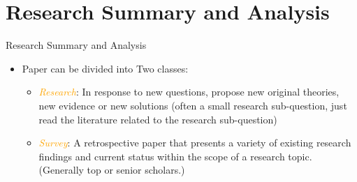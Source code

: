 \documentclass[
 size=14pt,
 paper=smartboard,  %
 mode=present, 		%
 display=slides, 	%
 style=tuliplab,  	%
 pauseslide,
 fleqn,leqno]{powerdot}{}
\begin{document}
\section{Research Summary and Analysis}

\begin{slide}[toc=,bm=]{Research Summary and Analysis}

\begin{itemize}
  \item Paper can be divided into Two classes:
  \begin{itemize}
    \item  \textcolor{orange}{\textit{Research}}: In response to new questions, propose new original theories, new evidence or new solutions (often a small research sub-question, just read the literature related to the research sub-question)
    \item  \textcolor{orange}{\textit{Survey}}: A retrospective paper that presents a variety of existing research findings and current status within the scope of a research topic. (Generally top or senior scholars.)
  \end{itemize}
\end{itemize}
\end{slide}
\end{document}
